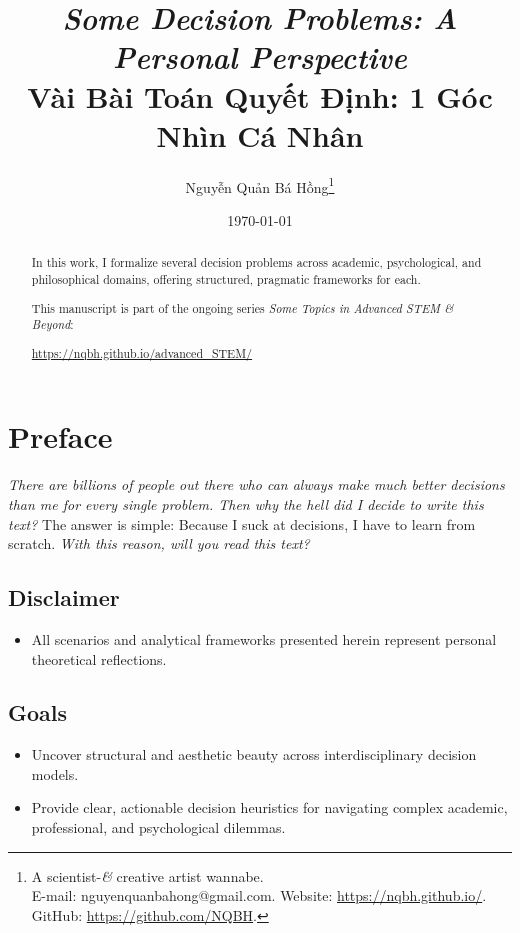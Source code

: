 \documentclass{article}
\title{\emph{Some Decision Problems: A Personal Perspective}\\ Vài Bài Toán Quyết Định: 1 Góc Nhìn Cá Nhân}
\author{Nguyễn Quản Bá Hồng\footnote{A scientist-\textit{\&} creative artist wannabe.\\E-mail: \sf nguyenquanbahong@gmail.com. Website: \url{https://nqbh.github.io/}. GitHub: \url{https://github.com/NQBH}.}}
\date{\today}
\begin{document}
\maketitle

\begin{abstract}
	In this work, I formalize several decision problems across academic, psychological, and philosophical domains, offering structured, pragmatic frameworks for each.
	
	This manuscript is part of the ongoing series \textit{Some Topics in Advanced STEM \& Beyond}:
	\begin{center}
		\url{https://nqbh.github.io/advanced_STEM/}
	\end{center}
\end{abstract}

\tableofcontents
\clearpage

\section{Preface}

\textit{There are billions of people out there who can always make much better decisions than me for every single problem. Then why the hell did I decide to write this text?} The answer is simple: Because I suck at decisions, I have to learn from scratch. \textit{With this reason, will you read this text?}

\subsection{Disclaimer}
\begin{itemize}
	\item All scenarios and analytical frameworks presented herein represent personal theoretical reflections.
\end{itemize}

\subsection{Goals}
\begin{itemize}
	\item Uncover structural and aesthetic beauty across interdisciplinary decision models.
	\item Provide clear, actionable decision heuristics for navigating complex academic, professional, and psychological dilemmas.
\end{itemize}
\end{document}
